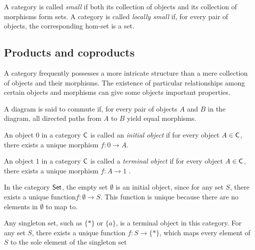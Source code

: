 \begin{definition}
  A category is called \emph{small} if both its collection of objects and its collection of morphisms form sets.
A category is called \emph{locally small} if, for every pair of objects, the corresponding hom-set is a set.
\end{definition}






\subsection{Products and coproducts}

 A category frequently possesses a more intricate structure than a mere collection of objects and their morphisms. The existence of particular relationships among certain objects and morphisms can give some objects important properties.

A diagram is said to commute if, for every pair of objects $A$ and $B$ in the diagram, all directed paths from 
$A$ to $B$ yield equal morphisms.

\begin{definition}
  An object \( 0 \) in a category \( \mathsf{C} \) is called an \emph{initial object} if for every object \( A \in \mathsf{C}  \), there exists a unique morphism  $f: 0 \to A $.

\end{definition}

\begin{definition}
  An object \( 1 \) in a category \( \mathsf{C}  \) is called a \emph{terminal object} if for every object \( A \in \mathsf{C}  \), there exists a unique morphism $ f: A \to 1 $ .
\end{definition}

\begin{example}
In the category \( \mathsf{Set} \), the empty set \( \emptyset \) is an initial object, since for any set \( S \), there exists a unique function$f : \emptyset \to S.$
This function is unique because there are no elements in \( \emptyset \) to map to.

Any singleton set, such as \( \{*\} \) or \( \{a\} \), is a terminal object in this category. For any set \( S \), there exists a unique function $f : S \to \{*\}$,
which maps every element of \( S \) to the sole element of the singleton set
\end{example}

